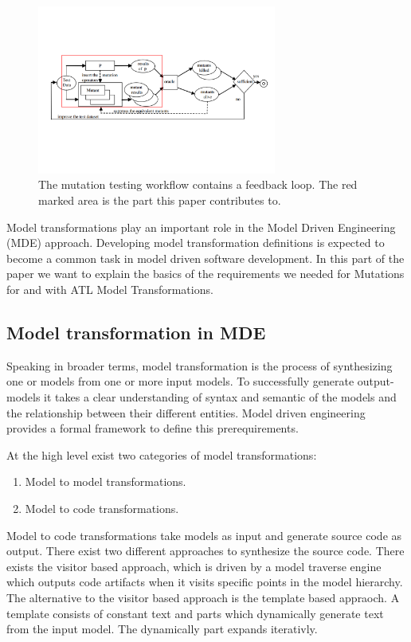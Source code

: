 \documentclass{llncs}
\begin{document}
\begin{figure}
	\centering
	\includegraphics[width=0.7\textwidth]{figures/Marked_Mutation_Process}
	\caption{The mutation testing workflow contains a feedback loop. The red marked area is the part this paper contributes to.\cite{MatMottu2006}}
	\label{fig:Marked_Mutation_Process}
\end{figure}

Model transformations play an important role in the Model Driven Engineering
(MDE) approach. Developing model transformation definitions is expected to
become a common task in model driven software development. \cite{atl:frederic}
In this part of the paper we want to explain the basics of the requirements we needed for Mutations for and with ATL Model Transformations.

\subsection{Model transformation in MDE}

Speaking in broader terms, model transformation is the process of synthesizing one or models from one or more input models. To successfully generate output-models it takes a clear understanding of syntax and semantic of the models and the relationship between their different entities. Model driven engineering provides a formal framework to define this prerequirements.\cite{Sendall:2003}

At the high level exist two categories of model transformations:\cite{Czarnecki03}

\begin{enumerate}
	\item Model to model transformations.
	\item Model to code transformations.
\end{enumerate}

Model to code transformations take models as input and generate source code as output. There exist two different approaches to synthesize the source code. There exists the visitor based approach, which is driven by a model traverse engine which outputs code artifacts when it visits specific points in the model hierarchy. The alternative to the visitor based approach is the template based appraoch. A template consists of constant text and parts which dynamically generate text from the input model. The dynamically part expands iterativly.\cite{Czarnecki03}
\end{document}
